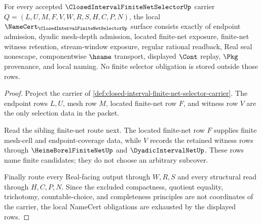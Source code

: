 \begin{theorem}
\label{thm:closed-interval-finite-net-selector-obligations}
For every accepted $\ClosedIntervalFiniteNetSelectorUp$ carrier $Q=(L,U,M,F,V,W,R,S,H,C,P,N)$, the local $\NameCert_{\ClosedIntervalFiniteNetSelectorUp}$ surface consists exactly of endpoint admission, dyadic mesh-depth admission, located finite-net exposure, finite-net witness retention, stream-window exposure, regular rational readback, Real seal nonescape, componentwise $\hsame$ transport, displayed $\Cont$ replay, $\Pkg$ provenance, and local naming. No finite selector obligation is stored outside those rows.
\end{theorem}
\begin{proof}
Project the carrier of \autoref{def:closed-interval-finite-net-selector-carrier}. The endpoint rows $L,U$, mesh row $M$, located finite-net row $F$, and witness row $V$ are the only selection data in the packet.

Read the sibling finite-net route next. The located finite-net row $F$ supplies finite mesh-cell and endpoint-coverage data, while $V$ records the retained witness rows through $\HeineBorelFiniteNetUp$ and $\DyadicIntervalNetUp$. These rows name finite candidates; they do not choose an arbitrary subcover.

Finally route every Real-facing output through $W,R,S$ and every structural read through $H,C,P,N$. Since the excluded compactness, quotient equality, trichotomy, countable-choice, and completeness principles are not coordinates of the carrier, the local NameCert obligations are exhausted by the displayed rows.
\end{proof}

